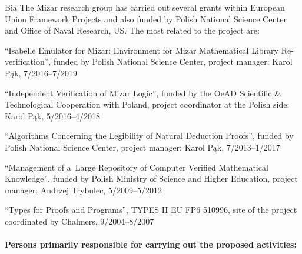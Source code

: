 \begin{sitedescription}{Bia}
The Mizar research group has carried out several grants within European Union Framework Projects 
and also funded by Polish National Science Center and Office of Naval Research, US.
The most related to the project are:

\begin{compactitem}
\item ``Isabelle Emulator for Mizar: Environment for Mizar Mathematical Library Re-verification'',
funded by Polish National Science Center, project manager: Karol Pąk, 7/2016--7/2019
\item ``Independent Verification of Mizar Logic'', funded by the OeAD Scientific \& Technological Cooperation with Poland,
project coordinator at the Polish side: Karol Pąk, 5/2016--4/2018
\item ``Algorithms Concerning the Legibility of Natural Deduction Proofs'', funded by Polish National Science Center,
project manager: Karol Pąk, 7/2013--1/2017
\item ``Management of a~Large Repository of Computer Verified Mathematical Knowledge'',
funded by Polish Ministry of Science and Higher Education, project manager: Andrzej Trybulec, 5/2009--5/2012
\item ``Types for Proofs and Programs'', TYPES II EU FP6 510996,
site of the project coordinated by Chalmers, 9/2004--8/2007
\end{compactitem}



\paragraph*{Persons primarily responsible for carrying out the proposed activities:}

\begin{compactitem}


\end{compactitem}
\end{sitedescription}
